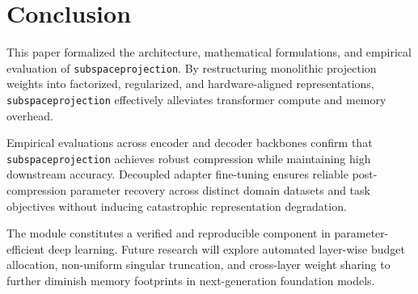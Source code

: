 \section{Conclusion}
This paper formalized the architecture, mathematical formulations, and empirical evaluation of \texttt{subspaceprojection}. By restructuring monolithic projection weights into factorized, regularized, and hardware-aligned representations, \texttt{subspaceprojection} effectively alleviates transformer compute and memory overhead.

Empirical evaluations across encoder and decoder backbones confirm that \texttt{subspaceprojection} achieves robust compression while maintaining high downstream accuracy. Decoupled adapter fine-tuning ensures reliable post-compression parameter recovery across distinct domain datasets and task objectives without inducing catastrophic representation degradation.

The module constitutes a verified and reproducible component in parameter-efficient deep learning. Future research will explore automated layer-wise budget allocation, non-uniform singular truncation, and cross-layer weight sharing to further diminish memory footprints in next-generation foundation models.
